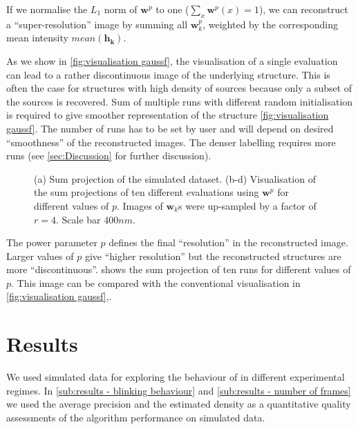 If we normalise the $L_1$ norm of $\bm{w}^p$ to one ($\sum_x \bm{w}^p(x)=1$), we can reconstruct a ``super-resolution'' image by summing all $\bm{w}_k^p$, weighted by the corresponding mean intensity $\unit{mean}(\bm{h_k})$. 

As we show in \autoref{fig:visualisation gaussf}\ccc, the visualisation of a single \inmf{} evaluation can lead to a rather discontinuous image of the underlying structure. This is often the case for structures with high density of sources because only a subset of the sources is recovered. Sum of multiple \inmf{} runs with different random initialisation is required to give smoother representation of the structure \autoref{fig:visualisation gaussf}\ddd. The number of \inmf{} runs has to be set by user and will depend on desired ``smoothness'' of the reconstructed images. The denser labelling requires more \inmf{} runs (see \autoref{sec:Discussion} for further discussion). 

\begin{figure}[!bt]
	\newcommand{\sizef}{.48}			
	\newcommand{\widthfig}{1\textwidth}	
	\centering
	\caption{(a) Sum projection of the simulated dataset. (b-d) Visualisation of the sum projections of ten different \inmf{} evaluations using $\bm{w}^p$ for different values of $p$. Images of $\bm{w}_k$s were up-sampled by a factor of $r=4$. Scale bar $400 \unit{nm}$.}
	\label{fig:demo pow w result}	
\end{figure}

The power parameter $p$ defines the final ``resolution'' in the reconstructed image. Larger values of $p$ give ``higher resolution'' but the reconstructed structures are more ``discontinuous''.  shows the sum projection of ten \inmf{} runs for different values of $p$. This image can be compared with the conventional visualisation in \autoref{fig:visualisation gaussf}\ccc,\ddd. 
\afterpage{\clearpage}

\section{Results \label{sec:results}}
We used simulated data for exploring the behaviour of \inmf{} in different experimental regimes. In \autoref{sub:results - blinking behaviour} and \ref{sub:results - number of frames} we used the average precision and the estimated density as a quantitative quality assessments of the algorithm performance on simulated data. 

